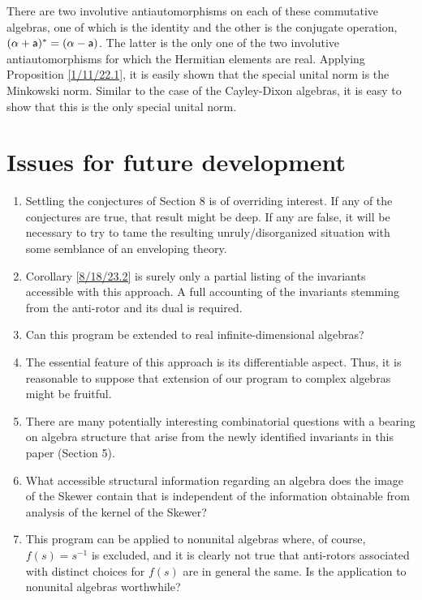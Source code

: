 \documentclass{amsart}
\theoremstyle{definition}
\numberwithin{theorem}{section}
\numberwithin{equation}{section}
\begin{document}
 There are two involutive antiautomorphisms on each of these commutative algebras, one of which is the identity and the other is the conjugate operation, $(\alpha+ {\sf a})^* = (\alpha- {\sf a})$. The latter is the only one of the two involutive antiautomorphisms  for which the Hermitian elements are real.  Applying Proposition \ref{1/11/22.1}, it is easily shown that the special unital norm is the Minkowski norm.  Similar to the case of the Cayley-Dixon algebras, it is easy to show that this is the only special unital norm.

\enlargethispage{1cm}
\section{Issues for future development} 
\begin{enumerate}
\item Settling the conjectures of Section 8 is of overriding interest.  If any of the conjectures are true, that result might be deep.  If any are false, it will be necessary to try to tame the resulting unruly/disorganized situation with some semblance of an enveloping theory.
\item Corollary \ref{8/18/23.2} is surely only a partial listing of the invariants accessible with this approach.  A full accounting of the invariants stemming from the anti-rotor and its dual is required.
\item Can this program be extended to real infinite-dimensional algebras?
\item The essential feature of this approach is its differentiable aspect.  Thus, it is reasonable to suppose that extension of our program to complex algebras might be fruitful. 
\item There are many potentially interesting combinatorial questions with a bearing on algebra structure that arise from the newly identified invariants in this paper (Section 5). \item What accessible structural information regarding an algebra does the image of the Skewer contain that is independent of the information obtainable from analysis of the kernel of the Skewer? 
\item This program can be applied to nonunital algebras where, of course, $f(s)=s^{-1}$ is excluded, and it is clearly not true that anti-rotors associated with distinct choices for $f(s)$ are in general the same.  Is the application to nonunital algebras worthwhile?
\end{enumerate}
\end{document}
